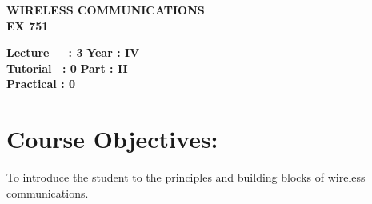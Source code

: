 \begin{center}
    \textbf{\huge{\uppercase{Wireless Communications}}}
    \\
    \vspace{.5cm}
    \textbf{\large{EX 751}}
\end{center}

\noindent\textbf{Lecture\ \ \ : 3} \hfill \textbf{Year : IV} \\
\textbf{Tutorial \ : 0} \hfill \textbf{Part : II } \\
\textbf{Practical : 0}  \\

\par
\noindent 
\section*{Course Objectives:}
To introduce the student to the principles and building blocks of wireless communications.


